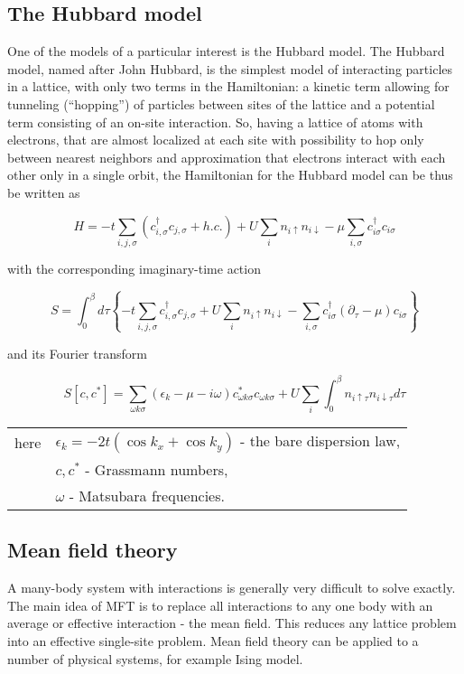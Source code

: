 \subsection{The Hubbard model}\label{sec:hubbard}
One of the models of a particular interest is the Hubbard model.
The Hubbard model, named after John Hubbard, is the simplest model of interacting particles in a lattice,
 with only two terms in the Hamiltonian: a kinetic term allowing for tunneling (``hopping'') of particles between sites of the lattice 
 and a potential term consisting of an on-site interaction.
So, having a lattice of atoms with electrons, that are almost localized at each site with possibility to hop
only between nearest neighbors and approximation that electrons interact with each other only in a single orbit, 
the Hamiltonian for the Hubbard model can be thus be written as

\begin{equation} H = -t \sum_{i,j,\sigma}(c_{i,\sigma}^\dagger c_{j,\sigma} + h.c.)+ U\sum_i n_{i\uparrow}n_{i\downarrow} - \mu\sum_{i,\sigma}c_{i\sigma}^\dagger c_{i\sigma} \end{equation}

with the corresponding imaginary-time action

\begin{equation} S = \int_0^\beta d\tau \left\{
  -t \sum_{i,j,\sigma}c_{i,\sigma}^\dagger c_{j,\sigma} + U\sum_i n_{i\uparrow}n_{i\downarrow} - \sum_{i,\sigma}c_{i\sigma}^\dagger (\partial_\tau-\mu) c_{i\sigma} \right\} \end{equation}

and its Fourier transform

\begin{equation} S[c,c^*] = \sum_{\omega k \sigma}(\epsilon_k-\mu-i\omega)c_{\omega k \sigma}^* c_{\omega k \sigma} + U\sum_i\int_0^\beta n_{i\uparrow\tau}n_{i\downarrow\tau} d\tau \end{equation}
 
\begin{tabular}{rl}
  here & $\epsilon_k = -2t(\cos{k_x}+\cos{k_y})$ - the bare dispersion law, \\
  & $c,c^*$ - Grassmann numbers, \\
  & $\omega$ - Matsubara frequencies.
\end{tabular}

\subsection{Mean field theory}
A many-body system with interactions is generally very difficult to solve exactly.
The main idea of MFT is to replace all interactions to any one body with an average or effective interaction - the mean field.
This reduces any lattice problem into an effective single-site problem.
Mean field theory can be applied to a number of physical systems, for example Ising model.

